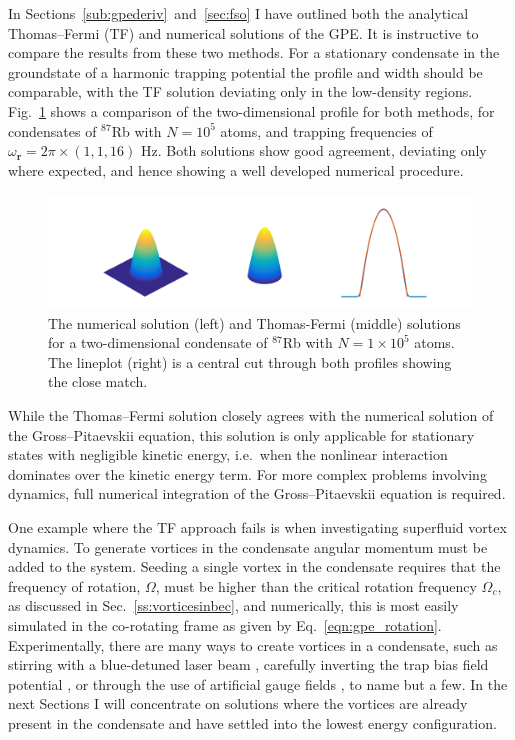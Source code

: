 In Sections~\ref{sub:gpederiv}~and~\ref{sec:fso} I have outlined both the analytical Thomas--Fermi (TF) and numerical solutions of the GPE. It is instructive to compare the results from these two methods. For a stationary condensate in the groundstate of a harmonic trapping potential the profile and width should be comparable, with the TF solution deviating only in the low-density regions. Fig.~\ref{fig:gpe_tf_3} shows a comparison of the two-dimensional profile for both methods, for condensates of $^{87}$Rb with $N=10^{5}$ atoms, and trapping frequencies of $\omega_{\mathbf{r}}=2\pi\times (1, 1, 16 )$ Hz. Both solutions show good agreement, deviating only where expected, and hence showing a well developed numerical procedure.
\begin{figure}\centering
    \includegraphics[width=\textwidth,trim=0ex 0ex 0ex 0ex]{Images/ch4_vtx/gpe_tf_3.pdf}
    \caption{The numerical solution (left) and Thomas-Fermi (middle) solutions for a two-dimensional condensate of $^{87}$Rb with $N=1\times 10^5$ atoms. The lineplot (right) is a central cut through both profiles showing the close match.}\label{fig:gpe_tf_3}
\end{figure}

While the Thomas--Fermi solution closely agrees with the numerical solution of the Gross--Pitaevskii equation, this solution is only applicable for stationary states with negligible kinetic energy, i.e.~when the nonlinear interaction dominates over the kinetic energy term. For more complex problems involving dynamics, full numerical integration of the Gross--Pitaevskii equation is required.

One example where the TF approach fails is when investigating superfluid vortex dynamics. To generate vortices in the condensate angular momentum must be added to the system. Seeding a single vortex in the condensate requires that the frequency of rotation, $\Omega$, must be higher than the critical rotation frequency $\Omega_c$, as discussed in Sec.~\ref{ss:vorticesinbec}, and numerically, this is most easily simulated in the co-rotating frame as given by Eq.~\eqref{eqn:gpe_rotation}. Experimentally, there are many ways to create vortices in a condensate, such as stirring with a blue-detuned laser beam \cite{Vtx:Raman_prl_2001}, carefully inverting the trap bias field potential \cite{VTX:Kawaguchi_pra_2004_2,VTX:Masuda_pra_2016}, or through the use of artificial gauge fields \cite{AO:Dalibard_rmp_2011}, to name but a few. In the next Sections I will concentrate on solutions where the vortices are already present in the condensate and have settled into the lowest energy configuration.


